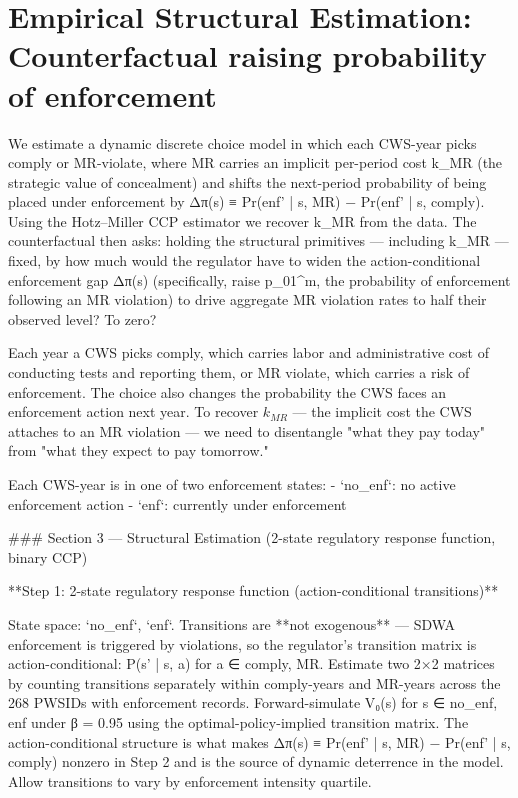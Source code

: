 \documentclass{article}
\begin{document}
\section{Empirical Structural Estimation: Counterfactual raising probability of enforcement}

We estimate a dynamic discrete choice model in which each CWS-year picks comply or MR-violate, where MR carries an implicit per-period cost k_MR (the strategic value of concealment) and shifts the next-period probability of being placed under enforcement by Δπ(s) ≡ Pr(enf' | s, MR) − Pr(enf' | s, comply). Using the Hotz–Miller CCP estimator we recover k_MR from the data. The counterfactual then asks: holding the structural primitives — including k_MR — fixed, by how much would the regulator have to widen the action-conditional enforcement gap Δπ(s) (specifically, raise p_01^m, the probability of enforcement following an MR violation) to drive aggregate MR violation rates to half their observed level? To zero?

Each year a CWS picks comply, which carries labor and administrative cost of conducting tests and reporting them, or MR violate, which carries a risk of enforcement. The choice also changes the probability the CWS faces an enforcement action next year. To recover $k_{MR}$ — the implicit cost the CWS attaches to an MR violation — we need to disentangle "what they pay today" from "what they expect to pay tomorrow."

Each CWS-year is in one of two enforcement states:
- `no_enf`: no active enforcement action
- `enf`: currently under enforcement

### Section 3 — Structural Estimation (2-state regulatory response function, binary CCP)

**Step 1: 2-state regulatory response function (action-conditional transitions)**

State space: {`no_enf`, `enf`}. Transitions are **not exogenous** — SDWA enforcement is triggered by violations, so the regulator's transition matrix is action-conditional: P(s' | s, a) for a ∈ {comply, MR}. Estimate two 2×2 matrices by counting transitions separately within comply-years and MR-years across the 268 PWSIDs with enforcement records. Forward-simulate V₀(s) for s ∈ {no_enf, enf} under β = 0.95 using the optimal-policy-implied transition matrix. The action-conditional structure is what makes Δπ(s) ≡ Pr(enf' | s, MR) − Pr(enf' | s, comply) nonzero in Step 2 and is the source of dynamic deterrence in the model. Allow transitions to vary by enforcement intensity quartile.
\end{document}
